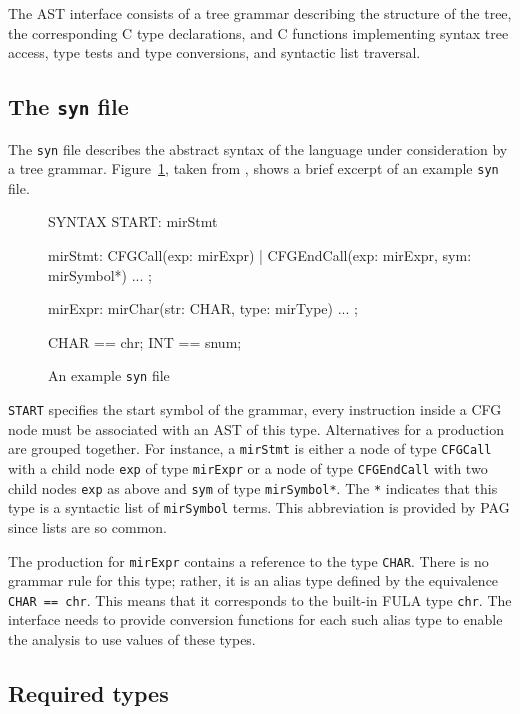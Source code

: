 The AST interface consists of a tree grammar describing the
structure of the tree, the corresponding C type declarations, and C
functions implementing syntax tree access, type tests and type
conversions, and syntactic list traversal.

\subsection{The {\tt syn} file}

The \verb|syn| file describes the abstract syntax of the language
under consideration by a tree grammar. Figure~\ref{syn}, taken from
\cite{pag}, shows a brief excerpt of an example \verb|syn| file.

\begin{figure}
    \centering
    \begin{boxedverbatim}
SYNTAX
START: mirStmt

mirStmt: CFGCall(exp: mirExpr)
       | CFGEndCall(exp: mirExpr, sym: mirSymbol*)
         ...
       ;

mirExpr: mirChar(str: CHAR, type: mirType)
         ...
       ;

CHAR == chr;
INT  == snum;\end{boxedverbatim}
    \caption{An example {\tt syn} file}
    \label{syn}
\end{figure}

\verb|START| specifies the start symbol of the grammar, every
instruction inside a CFG node must be associated with an AST of this
type. Alternatives for a production are grouped together. For
instance, a \verb|mirStmt| is either a node of type \verb|CFGCall|
with a child node \verb|exp| of type \verb|mirExpr| or a node of
type \verb|CFGEndCall| with two child nodes \verb|exp| as above and
\verb|sym| of type \verb|mirSymbol*|. The \verb|*| indicates that
this type is a syntactic list of \verb|mirSymbol| terms. This
abbreviation is provided by PAG since lists are so common.

The production for \verb|mirExpr| contains a reference to the type
\verb|CHAR|. There is no grammar rule for this type; rather, it is
an alias type defined by the equivalence \verb|CHAR == chr|. This
means that it corresponds to the built-in FULA type \verb|chr|. The
interface needs to provide conversion functions for each such
alias type to enable the analysis to use values of these types.

\subsection{Required types}

